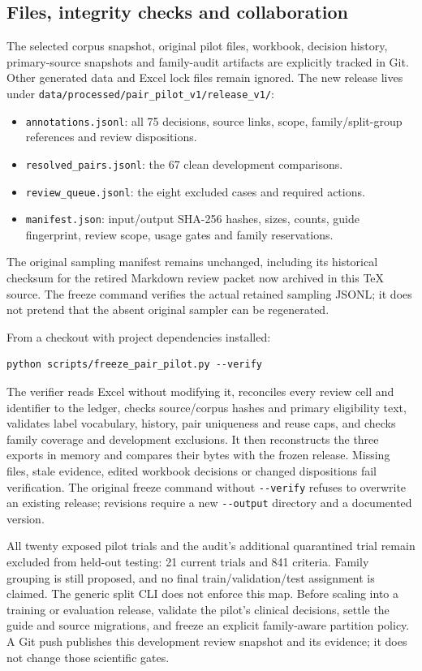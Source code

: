 \documentclass[10pt,letterpaper]{article}
\newcommand{\pathcode}[1]{\nolinkurl{#1}}
\begin{document}
\subsection{Files, integrity checks and collaboration}
The selected corpus snapshot, original pilot files, workbook, decision
history, primary-source snapshots and family-audit artifacts are explicitly
tracked in Git. Other generated data and Excel lock files remain ignored.
The new release lives under
\pathcode{data/processed/pair_pilot_v1/release_v1/}:
\begin{itemize}
\item \pathcode{annotations.jsonl}: all 75 decisions, source links, scope,
family/split-group references and review dispositions.
\item \pathcode{resolved_pairs.jsonl}: the 67 clean development comparisons.
\item \pathcode{review_queue.jsonl}: the eight excluded cases and required actions.
\item \pathcode{manifest.json}: input/output SHA-256 hashes, sizes, counts,
guide fingerprint, review scope, usage gates and family reservations.
\end{itemize}

The original sampling manifest remains unchanged, including its historical
checksum for the retired Markdown review packet now archived in this TeX
source. The freeze command verifies the actual retained sampling JSONL;
it does not pretend that the absent original sampler can be regenerated.

From a checkout with project dependencies installed:
\begin{Verbatim}[breaklines=true,fontsize=\small]
python scripts/freeze_pair_pilot.py --verify
\end{Verbatim}
The verifier reads Excel without modifying it, reconciles every review cell
and identifier to the ledger, checks source/corpus hashes and primary
eligibility text, validates label vocabulary, history, pair uniqueness and
reuse caps, and checks family coverage and development exclusions. It then
reconstructs the three exports in memory and compares their bytes with the
frozen release. Missing files, stale evidence, edited workbook decisions or
changed dispositions fail verification. The original freeze command without
\pathcode{--verify} refuses to overwrite an existing release; revisions
require a new \pathcode{--output} directory and a documented version.

All twenty exposed pilot trials and the audit's additional quarantined trial
remain excluded from held-out testing: 21 current trials and 841 criteria.
Family grouping is still proposed, and no final train/validation/test
assignment is claimed. The generic split CLI does not enforce this map.
Before scaling into a training or evaluation release, validate the pilot's
clinical decisions, settle the guide and source migrations, and freeze an
explicit family-aware partition policy. A Git push publishes this development
review snapshot and its evidence; it does not change those scientific gates.
\end{document}
